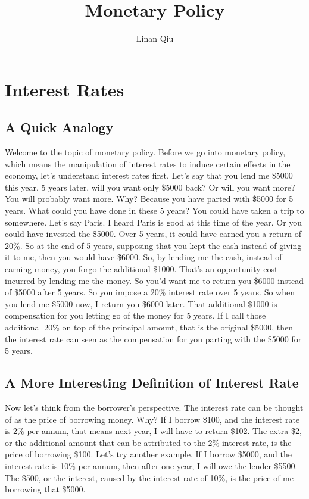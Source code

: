 \documentclass[DIV=classic,11pt,numbers=noenddot,listof=totoc,bibliography=totoc,parskip]{scrartcl}
\title{Monetary Policy}
\author{Linan Qiu}
\date{}
\begin{document}
\maketitle
\tableofcontents
\newpage
\newpage
\section{    Interest Rates}
\subsection{A Quick Analogy}
Welcome to the topic of monetary policy. Before we go into monetary policy, which means the manipulation of interest rates to induce certain effects in the economy, let’s understand interest rates first. Let’s say that you lend me \$5000 this year. 5 years later, will you want only \$5000 back? Or will you want more? You will probably want more. Why? Because you have parted with \$5000 for 5 years. What could you have done in these 5 years? You could have taken a trip to somewhere. Let’s say Paris. I heard Paris is good at this time of the year. Or you could have invested the \$5000. Over 5 years, it could have earned you a return of 20\%. So at the end of 5 years, supposing that you kept the cash instead of giving it to me, then you would have \$6000. So, by lending me the cash, instead of earning money, you forgo the additional \$1000. That’s an opportunity cost incurred by lending me the money. So you’d want me to return you \$6000 instead of \$5000 after 5 years. So you impose a 20\% interest rate over 5 years. So when you lend me \$5000 now, I return you \$6000 later. That additional \$1000 is compensation for you letting go of the money for 5 years. If I call those additional 20\% on top of the principal amount, that is the original \$5000, then the interest rate can seen as the compensation for you parting with the \$5000 for 5 years. 
\subsection{A More Interesting Definition of Interest Rate}
Now let’s think from the borrower’s perspective. The interest rate can be thought of as the price of borrowing money. Why? If I borrow \$100, and the interest rate is 2\% per annum, that means next year, I will have to return \$102. The extra \$2, or the additional amount that can be attributed to the 2\% interest rate, is the price of borrowing \$100. Let’s try another example. If I borrow \$5000, and the interest rate is 10\% per annum, then after one year, I will owe the lender \$5500. The \$500, or the interest, caused by the interest rate of 10\%, is the price of me borrowing that \$5000. 
\end{document}
